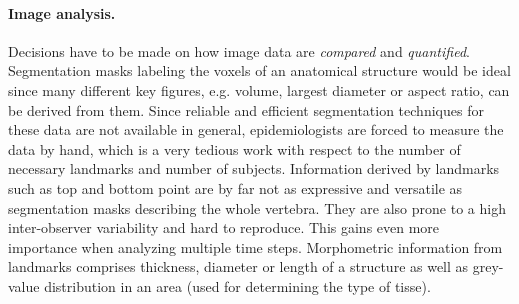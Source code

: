 \documentclass[journal]{style/vgtc} 			          %
\begin{document}
\paragraph{Image analysis.} \label{ImageAnalysis} Decisions have to be made on how image data are \emph{compared} and \emph{quantified}.
%
Segmentation masks labeling the voxels of an anatomical structure would be ideal since many different key figures, e.g. volume, largest diameter or aspect ratio, can be derived from them.
%
Since reliable and efficient segmentation techniques for these data are not available in general, epidemiologists are forced to measure the data by hand, which is a very tedious work with respect to the number of necessary landmarks and number of subjects.
%
Information derived by landmarks such as top and bottom point are by far not as expressive and versatile as segmentation masks describing the whole vertebra.
%
They are also prone to a high inter-observer variability and hard to reproduce.
%
This gains even more importance when analyzing multiple time steps.
%
Morphometric information from landmarks comprises thickness, diameter or length of a structure as well as grey-value distribution in an area (used for determining the type of tisse).

\end{document}
